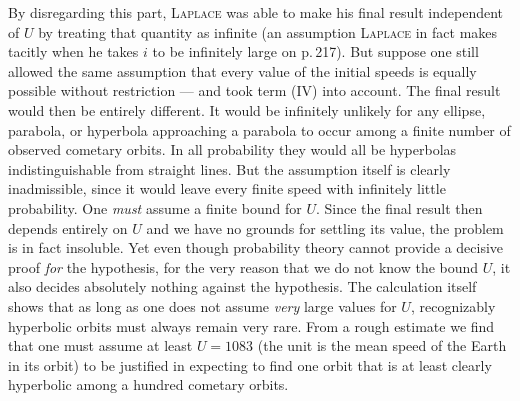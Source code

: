 By disregarding this part, \textsc{Laplace} was able to make his final result independent of $U$ by treating that quantity as infinite (an assumption \textsc{Laplace} in fact makes tacitly when he takes $i$ to be infinitely large on p.\,217). But suppose one still allowed the same assumption that every value of the initial speeds is equally possible without restriction --- and took term (IV) into account. The final result would then be entirely different. It would be infinitely unlikely for any ellipse, parabola, or hyperbola approaching a parabola to occur among a finite number of observed cometary orbits. In all probability they would all be hyperbolas indistinguishable from straight lines. But the assumption itself is clearly inadmissible, since it would leave every finite speed with infinitely little probability. One \emph{must} assume a finite bound for $U$. Since the final result then depends entirely on $U$ and we have no grounds for settling its value, the problem is in fact insoluble. Yet even though probability theory cannot provide a decisive proof \emph{for} the hypothesis, for the very reason that we do not know the bound $U$, it also decides absolutely nothing against the hypothesis. The calculation itself shows that as long as one does not assume \emph{very} large values for $U$, recognizably hyperbolic orbits must always remain very rare. From a rough estimate we find that one must assume at least $U = 1083$ (the unit is the mean speed of the Earth in its orbit) to be justified in expecting to find one orbit that is at least clearly hyperbolic among a hundred cometary orbits.

